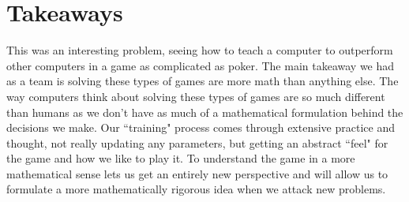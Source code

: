 \documentclass{article}
\begin{document}
    \section*{Takeaways}

    This was an interesting problem, seeing how to teach a computer to outperform other computers in a game as complicated as poker. The main takeaway we had as a team is solving these types of games are more math than anything else. The way computers think about solving these types of games are so much different than humans as we don't have as much of a mathematical formulation behind the decisions we make. Our ``training" process comes through extensive practice and thought, not really updating any parameters, but getting an abstract ``feel" for the game and how we like to play it. To understand the game in a more mathematical sense lets us get an entirely new perspective and will allow us to formulate a more mathematically rigorous idea when we attack new problems.

    
\end{document}

